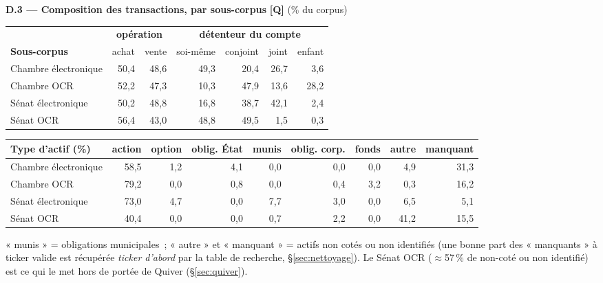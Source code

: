 \documentclass[11pt,a4paper]{article}
\begin{document}
\textbf{D.3 — Composition des transactions, par sous-corpus} \hfill {\footnotesize\textbf{[Q]} (\% du corpus)}
\begin{center}\small
\begin{tabular}{l rr @{\hspace{1.4em}} rrrr}
\toprule
& \multicolumn{2}{c}{\bfseries opération} & \multicolumn{4}{c}{\bfseries détenteur du compte}\\
\cmidrule(lr){2-3}\cmidrule(lr){4-7}
\bfseries Sous-corpus & achat & vente & soi-même & conjoint & joint & enfant\\
\midrule
Chambre électronique & 50,4 & 48,6 & 49,3 & 20,4 & 26,7 & 3,6 \\
Chambre OCR & 52,2 & 47,3 & 10,3 & 47,9 & 13,6 & 28,2 \\
Sénat électronique & 50,2 & 48,8 & 16,8 & 38,7 & 42,1 & 2,4 \\
Sénat OCR & 56,4 & 43,0 & 48,8 & 49,5 & 1,5 & 0,3 \\
\bottomrule
\end{tabular}
\end{center}
\begin{center}\small
\begin{tabular}{l rrrrrrrr}
\toprule
\bfseries Type d'actif (\%) & action & option & oblig. État & munis & oblig. corp. & fonds & autre & manquant\\
\midrule
Chambre électronique & 58,5 & 1,2 & 4,1 & 0,0 & 0,0 & 0,0 & 4,9 & 31,3 \\
Chambre OCR & 79,2 & 0,0 & 0,8 & 0,0 & 0,4 & 3,2 & 0,3 & 16,2 \\
Sénat électronique & 73,0 & 4,7 & 0,0 & 7,7 & 3,0 & 0,0 & 6,5 & 5,1 \\
Sénat OCR & 40,4 & 0,0 & 0,0 & 0,7 & 2,2 & 0,0 & 41,2 & 15,5 \\
\bottomrule
\end{tabular}
\end{center}
{\footnotesize « munis » = obligations municipales~; « autre » et « manquant » = actifs non cotés ou non
identifiés (une bonne part des « manquants » à ticker valide est récupérée \emph{ticker d'abord} par la
table de recherche, \S{}\ref{sec:nettoyage}). Le Sénat OCR ($\approx$57\,\% de non-coté ou non identifié) est
ce qui le met hors de portée de Quiver (\S{}\ref{sec:quiver}).}
\end{document}
